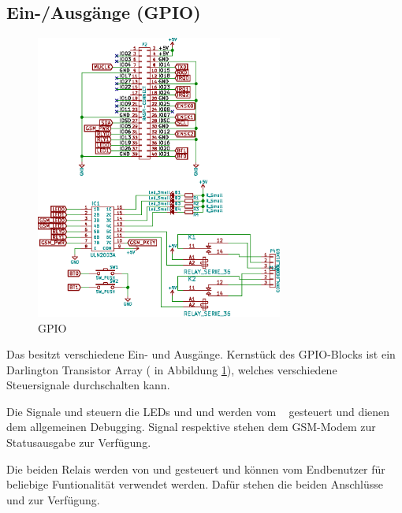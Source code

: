 

\clearpage
\subsection{Ein-/Ausg\"ange (GPIO)}
\label{subsec:hw:master:gpio}

\begin{figure}[h!t]
    \centering
    \includegraphics[width=0.725\textwidth]{images/superv-sch/supervisor--sch--gpio.eps}
    \caption[\Master: Schema GPIO]{GPIO \Master}
    \label{fig:sch:master:gpio}
\end{figure}


Das  \Master   besitzt  verschiedene  Ein-  und   Ausg\"ange. Kernst\"uck  des
GPIO-Blocks  ist  ein Darlington  Transistor  Array  ( in  Abbildung
\ref{fig:sch:master:gpio}),  welches verschiedene  Steuersignale durchschalten
kann.

Die  Signale    und   steuern  die  LEDs    und
  und  werden  vom  \Raspi~  gesteuert  und  dienen  dem  allgemeinen
Debugging. Signal    respektive    stehen  dem
GSM-Modem zur Statusausgabe zur Verf\"ugung.

Die   beiden  Relais   werden  von     und     gesteuert
und  k\"onnen  vom  Endbenutzer   f\"ur  beliebige  Funtionalit\"at  verwendet
werden. Daf\"ur stehen  die beiden  Anschl\"usse  und   zur
Verf\"ugung.

